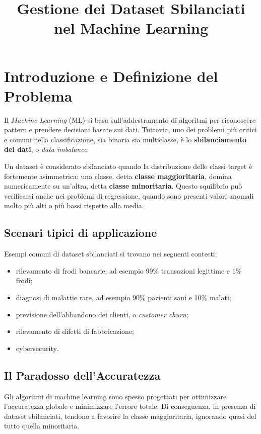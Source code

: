 \documentclass[11pt, a4paper]{article}
\title{Gestione dei Dataset Sbilanciati nel Machine Learning}
\author{}
\date{}
\begin{document}
\maketitle

\section{Introduzione e Definizione del Problema}

Il \emph{Machine Learning} (ML) si basa sull'addestramento di algoritmi per
riconoscere pattern e prendere decisioni basate sui dati. Tuttavia, uno dei
problemi più critici e comuni nella classificazione, sia binaria sia multiclasse,
è lo \textbf{sbilanciamento dei dati}, o \emph{data imbalance}.

Un dataset è considerato sbilanciato quando la distribuzione delle classi target
è fortemente asimmetrica: una classe, detta \textbf{classe maggioritaria},
domina numericamente su un'altra, detta \textbf{classe minoritaria}. Questo
squilibrio può verificarsi anche nei problemi di regressione, quando sono
presenti valori anomali molto più alti o più bassi rispetto alla media.

\subsection{Scenari tipici di applicazione}

Esempi comuni di dataset sbilanciati si trovano nei seguenti contesti:

\begin{itemize}
    \item rilevamento di frodi bancarie, ad esempio 99\% transazioni legittime
    e 1\% frodi;
    \item diagnosi di malattie rare, ad esempio 90\% pazienti sani e 10\%
    malati;
    \item previsione dell'abbandono dei clienti, o \emph{customer churn};
    \item rilevamento di difetti di fabbricazione;
    \item cybersecurity.
\end{itemize}

\subsection{Il Paradosso dell'Accuratezza}

Gli algoritmi di machine learning sono spesso progettati per ottimizzare
l'accuratezza globale e minimizzare l'errore totale. Di conseguenza, in presenza
di dataset sbilanciati, tendono a favorire la classe maggioritaria, ignorando
quasi del tutto quella minoritaria.
\end{document}

